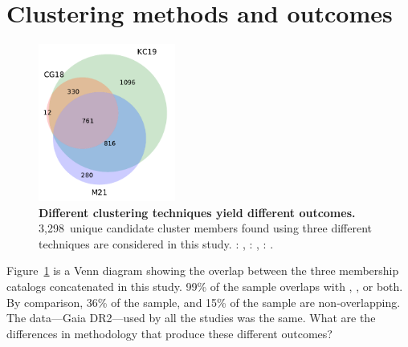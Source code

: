 \documentclass[12pt,twocolumn,tighten]{aastex63}
\newcommand{\nkinematic}{3{,}298\ } %
\begin{document}
% 
% 
% 
% 
% 
% 

\clearpage
                            
 

\appendix
\section{Clustering methods and outcomes}
\label{app:clustering}

\begin{figure}[h]
	\begin{center}
		\leavevmode
		\includegraphics[width=0.4\textwidth]{f10.pdf}
	\end{center}
	\vspace{-0.7cm}
  \caption{ {\bf Different clustering techniques yield different
  outcomes.} \nkinematic unique candidate cluster members found
  using three different techniques are considered in this study.
  : \citet{cantatgaudin_gaia_2018},
  :
  \citet{kounkel_untangling_2019}, :
  \citet{meingast_2021}.
  \label{fig:venn}
	}
\end{figure}

Figure~\ref{fig:venn} is a Venn diagram showing the overlap between
the three membership catalogs concatenated in this study.  99\% of the
 sample overlaps with
, , or
both.  By comparison, 36\% of the 
sample, and 15\% of the  sample are
non-overlapping.
The data---Gaia DR2---used by all the studies was the same.
What are the differences in methodology that produce these different
outcomes?
\end{document}
